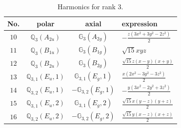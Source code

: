 \documentclass[fleqn,8pt,landscape]{jsarticle}
\begin{document}
\begin{table}[ht!]
\begin{center}
\caption{Harmonics for rank 3.}
\renewcommand{\arraystretch}{1.3}
\begin{tabular}{cccl} \hline \hline
No. & polar & axial & expression \\ \hline
$ 10 $ & $ \mathbb{Q}_{3}(A_{2u}) $ & $ \mathbb{G}_{3}(A_{2g}) $ & $ - \frac{z \left(3 x^{2} + 3 y^{2} - 2 z^{2}\right)}{2} $ \\
$ 11 $ & $ \mathbb{Q}_{3}(B_{1u}) $ & $ \mathbb{G}_{3}(B_{1g}) $ & $ \sqrt{15} x y z $ \\
$ 12 $ & $ \mathbb{Q}_{3}(B_{2u}) $ & $ \mathbb{G}_{3}(B_{2g}) $ & $ \frac{\sqrt{15} z \left(x - y\right) \left(x + y\right)}{2} $ \\
$ 13 $ & $ \mathbb{Q}_{3,1}(E_{u},1) $ & $ \mathbb{G}_{3,1}(E_{g},1) $ & $ \frac{x \left(2 x^{2} - 3 y^{2} - 3 z^{2}\right)}{2} $ \\
$ 14 $ & $ \mathbb{Q}_{3,2}(E_{u},1) $ & $ -\mathbb{G}_{3,2}(E_{g},1) $ & $ - \frac{y \left(3 x^{2} - 2 y^{2} + 3 z^{2}\right)}{2} $ \\
$ 15 $ & $ \mathbb{Q}_{3,1}(E_{u},2) $ & $ \mathbb{G}_{3,1}(E_{g},2) $ & $ \frac{\sqrt{15} x \left(y - z\right) \left(y + z\right)}{2} $ \\
$ 16 $ & $ \mathbb{Q}_{3,2}(E_{u},2) $ & $ -\mathbb{G}_{3,2}(E_{g},2) $ & $ \frac{\sqrt{15} y \left(x - z\right) \left(x + z\right)}{2} $ \\
 \hline \hline
\end{tabular}
\end{center}
\end{table}
\end{document}
